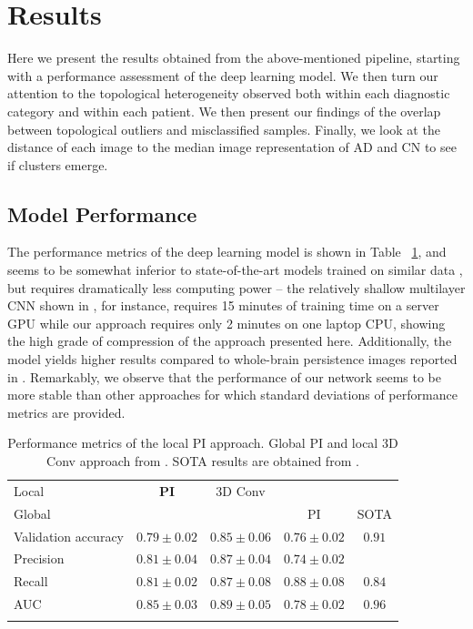 \documentclass{article}
\begin{document}
\section{Results}\label{sec:results}

Here we present the results obtained from the above-mentioned pipeline, starting with a performance
assessment of the deep learning model. We then turn our attention to the topological heterogeneity
observed both within each diagnostic category and within each patient. We then present our findings
of the overlap between topological outliers and misclassified samples. Finally, we look at the
distance of each image to the median image representation of AD and CN to see if clusters
emerge.

\subsection{Model Performance}

The performance metrics of the deep learning model is shown in Table ~\ref{tab:performance}, and
seems to be somewhat inferior to state-of-the-art models trained on similar data
\citep{wen2020convolutional}, but requires dramatically less computing power -- the relatively
shallow multilayer CNN shown in \citep{bruningk2020image}, for instance, requires 15 minutes of
training time on a server GPU while our approach requires only 2 minutes on one laptop CPU, showing
the high grade of compression of the approach presented here. Additionally, the model yields higher
results compared to whole-brain persistence images reported in \citep{bruningk2020image}.
Remarkably, we observe that the performance of our network seems to be more stable than other
approaches for which standard deviations of performance metrics are provided.

\begin{table}[b]
  \centering
  \begin{tabular}{lcccc}
    \toprule Local & \textbf{PI} & 3D Conv & & \\ Global &&& PI & SOTA \\ \midrule Validation
    accuracy & $0.79\pm 0.02$ & $0.85\pm 0.06$ & $ 0.76\pm 0.02$ & $0.91$\\ Precision & $0.81\pm
    0.04$ & $0.87\pm0.04$ & $0.74\pm 0.02$& \\ Recall & $0.81\pm 0.02$ & $0.87\pm0.08$ & $0.88\pm
    0.08$ &$0.84$\\ AUC & $0.85\pm 0.03$ & $0.89\pm0.05$ & $ 0.78\pm 0.02$ & $0.96$\\ \bottomrule
    \vspace{1pt}
  \end{tabular}
  \caption{Performance metrics of the local PI approach. Global PI and local 3D Conv approach from
    \citep{bruningk2020image}. SOTA results are obtained from \citep{liu2018anatomical}.}
  \label{tab:performance}
\end{table}
\end{document}
